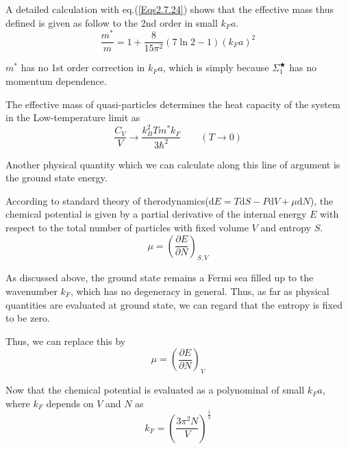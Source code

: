 A detailed calculation with eq.(\ref{Eqs2.7.24}) shows that the effective mass thus defined is given as follow to the 2nd order in small $k_F a$.
\begin{equation} \label{Eqs2.7.37}
\frac{m^{*}}{m} = 1+ \frac{8}{15\pi^2}(7 \ln2 -1)(k_F a)^2
\end{equation}

$m^{*}$ has no 1st order correction in $k_F a$, which is simply because $\Sigma_1^{\bigstar}$ has no momentum dependence.

The effective mass of quasi-particles determines the heat capacity of the system in the Low-temperature limit as
\begin{equation} \label{Eqs2.7.38}
\frac{C_V}{V} \rightarrow \frac{k_B^2 T m^{*} k_F}{3\hbar^2}\qquad(T \rightarrow 0)
\end{equation}

Another physical quantity which we can calculate along this line of argument is the ground state energy.

According to standard theory of therodynamics($\mathrm{d}E=T\mathrm{d}S-P\mathrm{d}V+\mu\mathrm{d}N$), the chemical potential is given by a partial derivative of the internal energy $E$ with respect to the total number of particles with fixed volume $V$ and entropy $S$.
\begin{equation} \label{Eqs2.7.39}
\mu = \left( \frac{\partial E}{\partial N} \right)_{S,V}
\end{equation}

As discussed above, the ground state remains a Fermi sea filled up to the wavenumber $k_F$, which has no degeneracy in general. Thus, as far as physical quantities are evaluated at ground state, we can regard that the entropy is fixed to be zero.

Thus, we can replace this by
\[ \mu = \left( \frac{\partial E}{\partial N} \right)_{V} \]

Now that the chemical potential is evaluated as a polynominal of small $k_F a$, where $k_F$ depends on $V$ and $N$ as 
\begin{equation} \label{Eqs2.7.40}
k_F = \left( \frac{3\pi^2 N}{V} \right)^{\frac{1}{3}} \end{equation}

